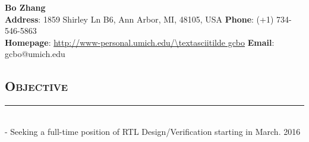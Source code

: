 \documentclass[11pt]{res}
\newcommand{\style}[1]{\color{Blue}\large\textsc{#1}}
\begin{document}
\begin{center}
\vspace{-3cm}

\textbf{\LARGE Bo Zhang}\\
\vspace{-1.0mm}
\hspace{-1.35cm}
{\indent \bf Address}: 1859 Shirley Ln B6, Ann Arbor, MI, 48105, USA \hfill {\bf Phone}: (+1) 734-546-5863\\
\vspace{-1.2mm}
\hspace{-1.35cm}
{\indent \bf Homepage}: {\color{Blue}\url{http://www-personal.umich.edu/\textasciitilde gcbo}} \hfill {\bf Email}: gcbo@umich.edu\\
\end{center}


\begin{resume}
\vspace{-35pt}
\section{\style{Objective}}
\vspace{-10pt}
\rule{18cm}{0.5mm}\\
 -\sectionwidth \resumewidth
Seeking a full-time position of RTL Design/Verification starting in March. 2016\hspace{-0.58in}
\vspace{-25pt}\\

\end{resume}
\end{document}
